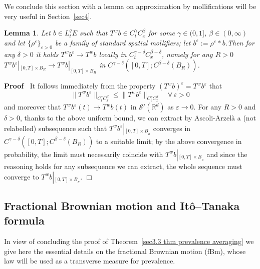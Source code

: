 \documentclass[10pt]{article}
\newcommand{\assign}{:=}
\newcommand{\nobracket}{}
\newenvironment{proof}{\noindent\textbf{Proof\ }}{\hspace*{\fill}$\Box$\medskip}
\newtheorem{lemma}{Lemma}
\begin{document}
We conclude this section with a lemma on approximation by mollifications will
be very useful in Section~\ref{sec4}.

\begin{lemma}
  \label{sec3.1 lemma 3}Let $b \in L^q_t E$ such that $T^w b \in C^{\gamma}_t
  C^{\beta}_x$ for some $\gamma \in (0, 1]$, $\beta \in (0, \infty)$ and let
  $\{ \rho^{\varepsilon} \}_{\varepsilon > 0}$ be a family of standard spatial
  mollifiers; let $b^{\varepsilon} \assign \rho^{\varepsilon} \ast b$.Then for
  any $\delta > 0$ it holds $T^w b^{\varepsilon} \rightarrow T^w b$ locally in
  $C^{\gamma - \delta}_t C^{\beta - \delta}_x$, namely for any $R > 0$ $T^w
  b^{\varepsilon} |_{[0, T] \times B_R} \nobracket \rightarrow T^w b |_{[0, T]
  \times B_R} \nobracket$ in $C^{\gamma - \delta} ([0, T] ; C^{\beta - \delta}
  (B_R))$.
\end{lemma}

\begin{proof}
  It follows immediately from the property $(T^w b)^{\varepsilon} = T^w
  b^{\varepsilon}$ that
  \[ \| T^w b^{\varepsilon} \|_{C^{\gamma}_t C^{\beta}_x} \leqslant \| T^w
     b^{\varepsilon} \|_{C^{\gamma}_t C^{\beta}_x} \quad \forall \,
     \varepsilon > 0 \]
  and moreover that $T^w b^{\varepsilon} (t) \rightarrow T^w b (t)$ in
  $\mathcal{S}' (\mathbb{R}^d)$ as $\varepsilon \rightarrow 0$. For any $R >
  0$ and $\delta > 0$, thanks to the above uniform bound, we can extract by
  Ascoli-Arzel{\`a} a (not relabelled) subsequence such that $T^w
  b^{\varepsilon} \left|_{[0, T] \times B_{_R}} \right.$ converges in
  $C^{\gamma - \delta} ([0, T] ; C^{\beta - \delta} (B_R))$ to a suitable
  limit; by the above convergence in probability, the limit must necessarily
  coincide with $T^w b \left|_{[0, T] \times B_{_R}} \right.$ and since the
  reasoning holds for any subsequence we can extract, the whole sequence must
  converge to $T^w b \left|_{[0, T] \times B_{_R}} \right.$.
\end{proof}

\subsection{Fractional Brownian motion and It\^{o}--Tanaka
formula}\label{sec2.2}

In view of concluding the proof of Theorem~\ref{sec3.3 thm prevalence
averaging} we give here the essential details on the fractional Brownian
motion (fBm), whose law will be used as a transverse measure for prevalence.
\end{document}
